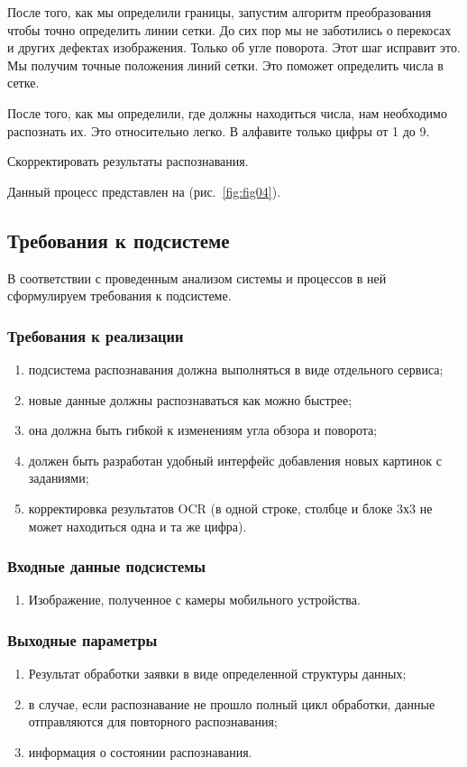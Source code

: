 После того, как мы определили границы, запустим алгоритм преобразования чтобы точно определить линии сетки. До сих пор мы не заботились о перекосах и других дефектах изображения. Только об угле поворота. Этот шаг исправит это. Мы получим точные положения линий сетки. Это поможет определить числа в сетке.

После того, как мы определили, где должны находиться числа, нам необходимо распознать их. Это относительно легко. В алфавите только цифры от 1 до 9.

Скорректировать результаты распознавания.

Данный процесс представлен на (рис.~\ref{fig:fig04}).

\subsection{Требования к подсистеме}
В соответствии с проведенным анализом системы и процессов в ней сформулируем требования к подсистеме.

\subsubsection*{Требования к реализации}
\begin{enumerate}
 \item подсистема распознавания должна выполняться в виде отдельного сервиса;
 \item новые данные должны распознаваться как можно быстрее;
 \item она должна быть гибкой к изменениям угла обзора и поворота;
 \item должен быть разработан удобный интерфейс добавления новых картинок с заданиями;
 \item корректировка результатов OCR (в одной строке, столбце и блоке 3х3 не может находиться одна и та же цифра).
\end{enumerate}

\subsubsection*{Входные данные подсистемы}

\begin{enumerate}
 \item Изображение, полученное с камеры мобильного устройства.
\end{enumerate}

\subsubsection*{Выходные параметры}
\begin{enumerate}
 \item Результат обработки заявки в виде определенной структуры данных;
 \item в случае, если распознавание не прошло полный цикл обработки, данные отправляются для повторного распознавания;
 \item информация о состоянии распознавания.
\end{enumerate}


